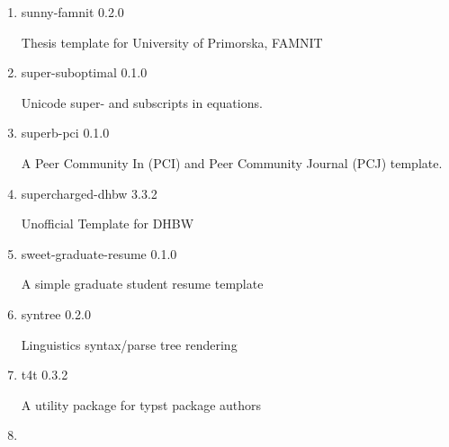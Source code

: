 \begin{enumerate}
  { subpar } { 0.2.0 }

  Create sub figures easily.
\item
  \href{/universe/package/sunny-famnit/}{}


  { sunny-famnit } { 0.2.0 }

  Thesis template for University of Primorska, FAMNIT
\item
  \href{/universe/package/super-suboptimal/}{}

  { super-suboptimal } { 0.1.0 }

  Unicode super- and subscripts in equations.
\item
  \href{/universe/package/superb-pci/}{}


  { superb-pci } { 0.1.0 }

  A Peer Community In (PCI) and Peer Community Journal (PCJ) template.
\item
  \href{/universe/package/supercharged-dhbw/}{}


  { supercharged-dhbw } { 3.3.2 }

  Unofficial Template for DHBW
\item
  \href{/universe/package/sweet-graduate-resume/}{}


  { sweet-graduate-resume } { 0.1.0 }

  A simple graduate student resume template
\item
  \href{/universe/package/syntree/}{}

  { syntree } { 0.2.0 }

  Linguistics syntax/parse tree rendering
\item
  \href{/universe/package/t4t/}{}

  { t4t } { 0.3.2 }

  A utility package for typst package authors
\item
  \href{/universe/package/tablem/}{}


\end{enumerate}

